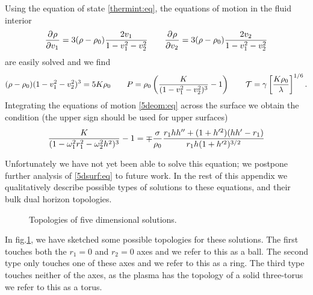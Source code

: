 Using the equation of state \eqref{thermint:eq}, the equations of
motion in the fluid interior
%
\begin{equation*}
  \pdiff{\rho}{v_1} = 3(\rho-\rz) \frac{2v_1}{1-v_1^2-v_2^2}  \qquad
  \pdiff{\rho}{v_2} = 3(\rho-\rz) \frac{2v_2}{1-v_1^2-v_2^2}
\end{equation*}
%
are easily solved and we find
%
\begin{equation*}
  (\rho-\rho_0)(1-v_1^2-v_2^2)^3 = 5K\rho_0 \qquad
  P = \rho_0\left ( \frac{K}{(1-v_1^2-v_2^2)^3}-1 \right )
  \qquad \mathcal{T} = \gamma\left [ \frac{K\rho_0}{\lambda} \right ]^{1/6}.
\end{equation*}
%
Integrating the equations of motion \eqref{5deom:eq} across the
surface we obtain the condition (the upper sign should be used for
upper surfaces)
%
\begin{equation}\label{5dsurf:eq}
  \frac{K}{(1-\omega_1^2r_1^2-\omega_2^2h^2)^3}-1 =
     \mp\frac{\sigma}{\rho_0}
     \frac{r_1hh''+(1+h'^2)(hh'-r_1)}{r_1h(1+h'^2)^{3/2}}
\end{equation}
%

Unfortunately we have not yet been able to solve this equation; we
postpone further analysis of \eqref{5dsurf:eq} to future work. In
the rest of this appendix we qualitatively describe possible types
of solutions to these equations, and their bulk dual horizon
topologies.

\begin{figure}
%
\begin{center}
  \hspace{0.5cm}
  \hspace{0.5cm}
  
  \caption{Topologies of five dimensional solutions.}\label{5d:fig}
\end{center}
%
\end{figure}



In fig.\ref{5d:fig}, we have sketched some possible topologies for
these solutions. The first touches both the $r_1=0$ and $r_2=0$ axes
and we refer to this as a ball. The second type only touches one of
these axes and we refer to this as a ring. The third type touches
neither of the axes, as the plasma has the topology of a solid
three-torus we refer to this as a torus.

